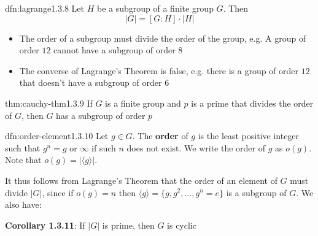 \documentclass{article}
\begin{document}
\begin{thm}{dfn:lagrange}{1.3.8}
    Let $H$ be a subgroup of a finite group $G$. Then
    \[\lvert G \rvert = [G : H] \cdot \lvert H \rvert\]

    \begin{itemize}
        \item The order of a subgroup must divide the order of the group, e.g. A group of order $12$ cannot have a subgroup of order $8$
        \item The converse of Lagrange's Theorem is false, e.g. there is a group of order $12$ that doesn't have a subgroup of order $6$
    \end{itemize}
\end{thm}

\begin{thm}{thm:cauchy-thm}{1.3.9}
    If $G$ is a finite group and $p$ is a prime that divides the order of $G$, then $G$ has a subgroup of order $p$
\end{thm}

\begin{dfn}{dfn:order-element}{1.3.10}
    Let $g\in G$. The \textbf{order} of $g$ is the least positive integer such that $g^{n} = g$ or $\infty$ if such $n$ does not exist. We write the order of $g$ as $o(g)$. Note that $o(g) = \lvert \langle g \rangle \rvert$.

    It thus follows from Lagrange's Theorem that the order of an element of $G$ must divide $\lvert G \rvert$, since if $o(g) = n$ then $\langle g \rangle = \{g, g^{2},\dots, g^{n} = e\}$ is a subgroup of $G$. We also have:

    \longrule{0.08ex}

    \textbf{Corollary 1.3.11}: If $\lvert G \rvert$ is prime, then $G$ is cyclic
\end{dfn}
\end{document}
